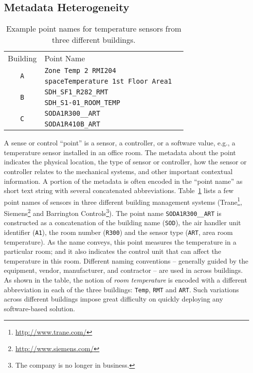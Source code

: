 \subsection{Metadata Heterogeneity}
\begin{table}[h]
\centering
\begin{tabular}{c|ll}
\cline{1-2}
Building & Point Name & \\
\cline{1-2}
\multirow{2}{*}{\texttt{A}}  & \texttt{Zone Temp 2 RMI204} &  \\
					& \texttt{spaceTemperature 1st Floor Area1} &  \\ \cline{1-2}
\multirow{2}{*}{\texttt{B}} & \texttt{SDH\_SF1\_R282\_RMT} &  \\
                     & \texttt{SDH\_S1-01\_ROOM\_TEMP} &  \\ \cline{1-2}
\multirow{2}{*}{\texttt{C}}  & \texttt{SODA1R300\_\_ART} &  \\
					  & \texttt{SODA1R410B\_ART} &  \\ \cline{1-2}
\end{tabular}
\caption{Example point names for temperature sensors from three different buildings.}
\label{table:ex}
\end{table}


A sense or control ``point'' is a sensor,
a controller, or a software value, e.g., a temperature sensor
installed in an office room. The metadata about the point indicates the physical
location, the type of sensor or controller, how the sensor or controller relates
to the mechanical systems, and other important contextual information. A portion of
the metadata is often encoded in the
``point name'' as short
text string with several concatenated abbreviations. Table~\ref{table:ex} lists 
a few point names of sensors in three different building management systems 
(Trane\footnote{\url{http://www.trane.com/}}, Siemens\footnote{\url{http://www.siemens.com/}} 
and Barrington Controls\footnote{The company is no longer in business.}). 
The point name \texttt{SODA1R300\_\_ART} is constructed as a
concatenation of the building name (\texttt{SOD}), the air handler unit
identifier (\texttt{A1}), the room number (\texttt{R300}) and the sensor type
(\texttt{ART}, area room temperature). As the name conveys, this point measures 
the temperature in a particular room; and it also indicates the control unit that 
can affect the temperature in this room. Different naming conventions -- 
generally guided by the equipment, vendor, manufacturer, 
and contractor --
are used in across buildings. As shown in the table, the notion of {\em room temperature} is encoded 
with a different abbreviation in each of the three buildings: \texttt{Temp}, \texttt{RMT} and \texttt{ART}.
Such variations across different buildings impose great difficulty on quickly deploying any software-based
solution.

